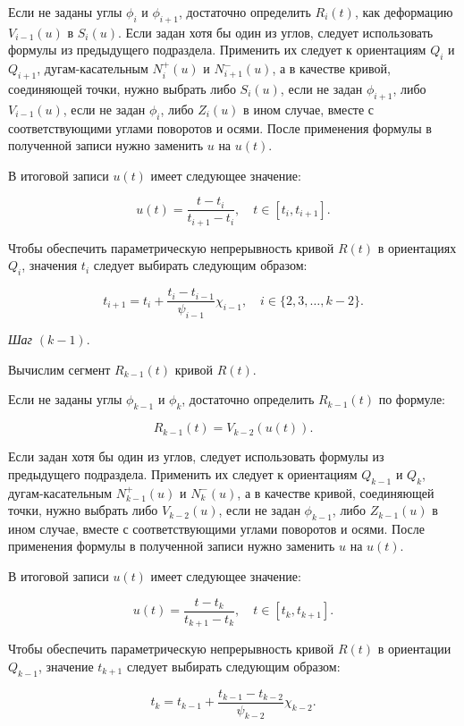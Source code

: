 Если не заданы углы $\phi_i$ и $\phi_{i+1}$, достаточно определить $R_i(t)$, как деформацию $V_{i-1}(u)$ в $S_i(u)$.
Если задан хотя бы один из углов, следует использовать формулы из предыдущего подраздела. Применить их следует к
ориентациям $Q_i$ и $Q_{i+1}$, дугам-касательным $N_i^+(u)$ и $N_{i+1}^-(u)$, а в качестве кривой, соединяющей точки,
нужно выбрать либо $S_i(u)$, если не задан $\phi_{i+1}$, либо $V_{i-1}(u)$, если не задан $\phi_i$, либо $Z_i(u)$
в ином случае, вместе с соответствующими углами поворотов и осями. После применения формулы в полученной записи нужно
заменить $u$ на $u(t)$.

В итоговой записи $u(t)$ имеет следующее значение:

$$
u(t)=\frac{t-t_i}{t_{i+1}-t_i}, \quad t \in [t_i,t_{i+1}].
$$

Чтобы обеспечить параметрическую непрерывность кривой $R(t)$ в ориентациях $Q_i$, значения $t_i$ следует выбирать
следующим образом:

$$
t_{i+1}=t_i+\frac{t_i-t_{i-1}}{\psi_{i-1}}\chi_{i-1}, \quad i \in \{2,3,\dots,k-2\}.
$$

\bigskip
\textit{Шаг} $(k-1)$.

Вычислим сегмент $R_{k-1}(t)$ кривой $R(t)$.

Если не заданы углы $\phi_{k-1}$ и $\phi_k$, достаточно определить $R_{k-1}(t)$ по формуле:

$$
R_{k-1}(t)=V_{k-2}(u(t)).
$$

Если задан хотя бы один из углов, следует использовать формулы из предыдущего подраздела. Применить их следует к
ориентациям $Q_{k-1}$ и $Q_k$, дугам-касательным $N_{k-1}^+(u)$ и $N_k^-(u)$, а в качестве кривой, соединяющей точки,
нужно выбрать либо $V_{k-2}(u)$, если не задан $\phi_{k-1}$, либо $Z_{k-1}(u)$ в ином случае, вместе с соответствующими
углами поворотов и осями. После применения формулы в полученной записи нужно заменить $u$ на $u(t)$.

В итоговой записи $u(t)$ имеет следующее значение:

$$
u(t)=\frac{t-t_k}{t_{k+1}-t_k}, \quad t \in [t_k,t_{k+1}].
$$

Чтобы обеспечить параметрическую непрерывность кривой $R(t)$ в ориентации $Q_{k-1}$, значение $t_{k+1}$ следует выбирать
следующим образом:

$$
t_k=t_{k-1}+\frac{t_{k-1}-t_{k-2}}{\psi_{k-2}}\chi_{k-2}.
$$
